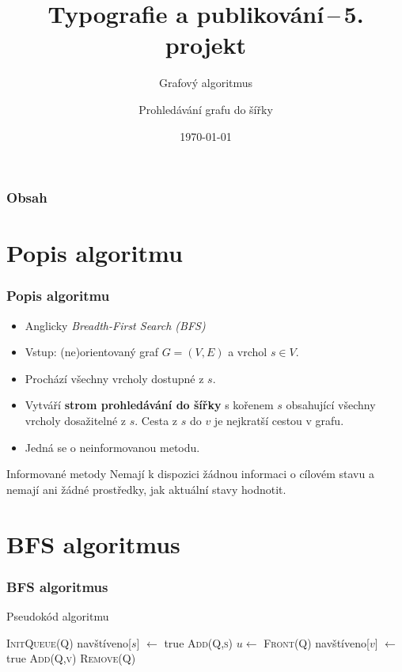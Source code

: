 \documentclass{beamer}
\title{Typografie a publikování\,--\,5. projekt}
\subtitle{Grafový algoritmus}
\author{Prohledávání grafu do šířky}
\date{\today}
\begin{document}
\frame{\titlepage}

\begin{frame}
    \frametitle{Obsah}
    \tableofcontents
\end{frame}

\section{Popis algoritmu}
\begin{frame}\frametitle{Popis algoritmu}
    \begin{itemize}
        \item Anglicky \emph{Breadth-First Search (BFS)}
        \item Vstup: (ne)orientovaný graf $G = (V, E)$ a vrchol $s \in V$.
        \item Prochází všechny vrcholy dostupné z $s$.
        \item Vytváří \textbf{strom prohledávání do šířky} s kořenem $s$ obsahující všechny vrcholy dosažitelné z $s$. Cesta z $s$ do $v$ je nejkratší cestou v grafu.
        \item Jedná se o neinformovanou metodu.
    \end{itemize}
    \begin{block}{Informované metody}
        Nemají k dispozici žádnou informaci o cílovém stavu a nemají ani žádné prostředky, jak aktuální stavy hodnotit.
    \end{block}
\end{frame}

\section{BFS algoritmus}
\begin{frame} \frametitle{BFS algoritmus}
    \begin{block}{Pseudokód algoritmu}
        \begin{algorithmic}[0]
            \State \textsc{InitQueue(Q)}
            \State navštíveno[$s$] $\gets$ true
            \State \textsc{Add(Q,s)}
                \State $u \gets$ \textsc{Front(Q)}
                        \State navštíveno[$v$] $\gets$ true
                        \State \textsc{Add(Q,v)}
                    \EndIf
                \EndFor
                \State \textsc{Remove(Q)}
            \EndWhile
            \EndProcedure
        \end{algorithmic}
    \end{block}
\end{frame}
\end{document}
